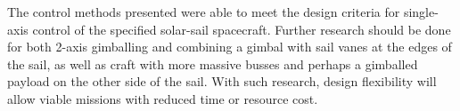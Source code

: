 \documentclass[]{aiaa-tc}%
\begin{document}
	\vspace{5 mm}

	The control methods presented were able to meet the design criteria for single-axis control of the specified solar-sail spacecraft. Further research should be done for both 2-axis gimballing and combining a gimbal with sail vanes at the edges of the sail, as well as craft with more massive busses and perhaps a gimballed payload on the other side of the sail. With such research, design flexibility will allow viable missions with reduced time or resource cost.



%    
    
%    
%    
%    
%
%
%
%
	
\end{document}
